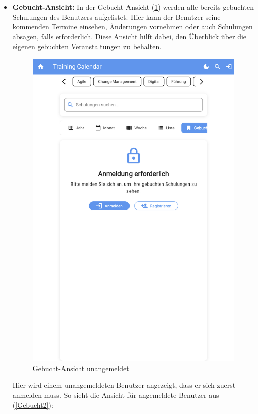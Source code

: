 \begin{itemize}
    \item \textbf{Gebucht-Ansicht:} In der Gebucht-Ansicht (\ref{Gebucht})  werden alle bereits gebuchten Schulungen des Benutzers aufgelistet. Hier kann der Benutzer seine kommenden Termine einsehen, Änderungen vornehmen oder auch Schulungen absagen, falls erforderlich. Diese Ansicht hilft dabei, den Überblick über die eigenen gebuchten Veranstaltungen zu behalten.
\begin{figure}[htbp!]
        \centering
        \includegraphics[scale=0.2]{img/flutter_11.png}
        \caption{Gebucht-Ansicht unangemeldet}
        \label{Gebucht}
    \end{figure}
Hier wird einem unangemeldeten Benutzer angezeigt, dass er sich zuerst anmelden muss. So sieht die Ansicht für angemeldete Benutzer aus (\ref{Gebucht2}): 

\end{itemize}
